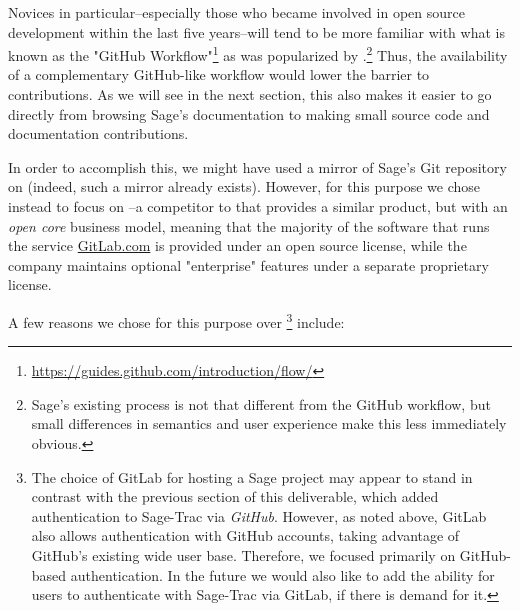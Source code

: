 Novices in particular--especially those who became involved in open source
development within the last five years--will tend to be more familiar with what
is known as the "GitHub
Workflow"\footnote{\url{https://guides.github.com/introduction/flow/}} as was
popularized by \GitHub.\footnote{Sage's existing process is not that different
from the GitHub workflow, but small differences in semantics and user
experience make this less immediately obvious.} Thus, the availability of a
complementary GitHub-like workflow would lower the barrier to contributions.
As we will see in the next section, this also makes it easier to go directly
from browsing Sage's documentation to making small source code and
documentation contributions.

In order to accomplish this, we might have used a mirror of Sage's Git
repository on \GitHub (indeed, such a mirror already exists).  However, for
this purpose we chose instead to focus on \GitLab--a competitor to \GitHub that
provides a similar product, but with an {\em open core} business model, meaning
that the majority of the software that runs the service \url{GitLab.com} is
provided under an open source license, while the company maintains optional
"enterprise" features under a separate proprietary license.

A few reasons we chose \GitLab for this purpose over \GitHub \footnote{The
choice of GitLab for hosting a Sage project may appear to stand in contrast
with the previous section of this deliverable, which added authentication to
Sage-Trac via {\em GitHub}.  However, as noted above, GitLab also allows
authentication with GitHub accounts, taking advantage of GitHub's existing wide
user base.  Therefore, we focused primarily on GitHub-based authentication.  In
the future we would also like to add the ability for users to authenticate with
Sage-Trac via GitLab, if there is demand for it.} include:


